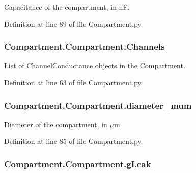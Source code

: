 Capacitance of the compartment, in nF. 



Definition at line 89 of file Compartment.\+py.

\subsubsection[{\texorpdfstring{Channels}{Channels}}]{\setlength{\rightskip}{0pt plus 5cm}Compartment.\+Compartment.\+Channels}\hypertarget{class_compartment_1_1_compartment_aa444563be9598d7cc54fd8d10ea6a04f}{}\label{class_compartment_1_1_compartment_aa444563be9598d7cc54fd8d10ea6a04f}


List of \hyperlink{namespace_channel_conductance}{Channel\+Conductance} objects in the \hyperlink{class_compartment_1_1_compartment}{Compartment}. 



Definition at line 63 of file Compartment.\+py.

\subsubsection[{\texorpdfstring{diameter\+\_\+mum}{diameter_mum}}]{\setlength{\rightskip}{0pt plus 5cm}Compartment.\+Compartment.\+diameter\+\_\+mum}\hypertarget{class_compartment_1_1_compartment_aacb7db7022f5d3534d17642d47281cbb}{}\label{class_compartment_1_1_compartment_aacb7db7022f5d3534d17642d47281cbb}


Diameter of the compartment, in $\mu$m. 



Definition at line 85 of file Compartment.\+py.

\subsubsection[{\texorpdfstring{g\+Leak}{gLeak}}]{\setlength{\rightskip}{0pt plus 5cm}Compartment.\+Compartment.\+g\+Leak}\hypertarget{class_compartment_1_1_compartment_a10d50da6a622982a6483c7cd78482bde}{}\label{class_compartment_1_1_compartment_a10d50da6a622982a6483c7cd78482bde}


